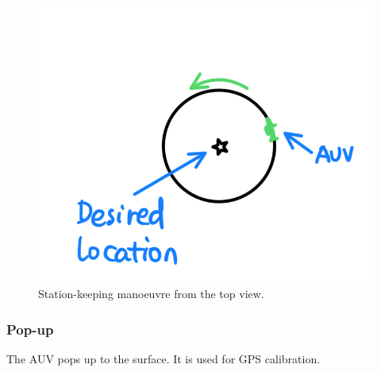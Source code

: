 \documentclass[a4paper,12pt]{report}
\begin{document}
\begin{figure}
    \centering
    \includegraphics{fig/station_keeping.png}
    \caption{Station-keeping manoeuvre from the top view.}
    \label{fig:station_keeping}
\end{figure}


\subsubsection*{Pop-up}
The AUV pops up to the surface. It is used for GPS calibration. 
\end{document}
